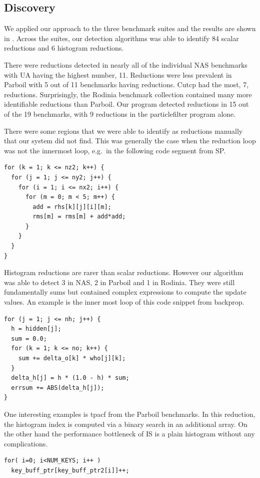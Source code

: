 \subsection{Discovery}
We applied our approach to the three benchmark suites  and the results are shown in . 
Across the suites, our detection algorithms
was able to identify 84 scalar reductions and 6 histogram reductions.

There were reductions detected in nearly all of the individual NAS benchmarks with UA having the highest number, 11.
Reductions were less prevalent in Parboil with 5 out of 11
benchmarks having reductions. Cutcp had the most, 7, reductions. 
Surprisingly, the Rodinia benchmark collection contained many more identifiable reductions than Parboil.
Our program detected reductions in 15 out of the 19 benchmarks, with 9 reductions in the particlefilter program alone.

There were some regions that we were able to identify as reductions manually that our system did not find.
This was generally the case when the reduction loop was not the innermost loop, e.g.\ in the following code segment from SP.
\begin{lstlisting}
for (k = 1; k <= nz2; k++) {
  for (j = 1; j <= ny2; j++) {
    for (i = 1; i <= nx2; i++) {
      for (m = 0; m < 5; m++) {
        add = rhs[k][j][i][m];
        rms[m] = rms[m] + add*add;
      } 
    } 
  } 
}
\end{lstlisting}


Histogram reductions are rarer than scalar reductions.  However
our algorithm was able to detect 3 in NAS, 2 in Parboil and 1 in
Rodinia.   They were still fundamentally sums but contained
complex expressions to compute the update values.  An  example is the
inner most loop of this code snippet from backprop.
\begin{lstlisting}
for (j = 1; j <= nh; j++) {
  h = hidden[j];
  sum = 0.0;
  for (k = 1; k <= no; k++) {
    sum += delta_o[k] * who[j][k];
  }
  delta_h[j] = h * (1.0 - h) * sum;
  errsum += ABS(delta_h[j]);
}
\end{lstlisting}

One interesting examples is tpacf from the Parboil benchmarks.
In this reduction, the histogram index is computed via a binary search in an additional array.
On the other hand the performance bottleneck of IS is a plain histogram without any complications.
\begin{lstlisting}
for( i=0; i<NUM_KEYS; i++ )
  key_buff_ptr[key_buff_ptr2[i]]++;
\end{lstlisting}

